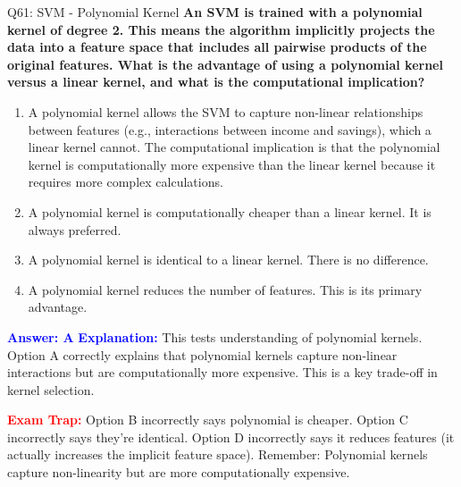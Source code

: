 \documentclass[8pt]{beamer}
\begin{document}
	\begin{frame}{Q61: SVM - Polynomial Kernel}
		\fontsize{6.5}{7.5}\selectfont
		\textbf{An SVM is trained with a polynomial kernel of degree 2. This means the algorithm implicitly projects the data into a feature space that includes all pairwise products of the original features. What is the advantage of using a polynomial kernel versus a linear kernel, and what is the computational implication?}
		
		\begin{enumerate}
			\item A polynomial kernel allows the SVM to capture non-linear relationships between features (e.g., interactions between income and savings), which a linear kernel cannot. The computational implication is that the polynomial kernel is computationally more expensive than the linear kernel because it requires more complex calculations.
			\item A polynomial kernel is computationally cheaper than a linear kernel. It is always preferred.
			\item A polynomial kernel is identical to a linear kernel. There is no difference.
			\item A polynomial kernel reduces the number of features. This is its primary advantage.
		\end{enumerate}
		
		\vspace{0.1cm}
		\textcolor{blue}{\textbf{Answer: A}}
		\vspace{0.1cm}
		\textcolor{blue}{\textbf{Explanation:}} This tests understanding of polynomial kernels. Option A correctly explains that polynomial kernels capture non-linear interactions but are computationally more expensive. This is a key trade-off in kernel selection.
		
		\textcolor{red}{\textbf{Exam Trap:}} Option B incorrectly says polynomial is cheaper. Option C incorrectly says they're identical. Option D incorrectly says it reduces features (it actually increases the implicit feature space). Remember: Polynomial kernels capture non-linearity but are more computationally expensive.
	\end{frame}
	
\end{document}
